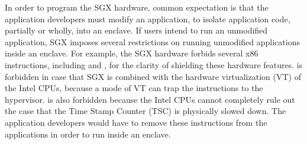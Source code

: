 In order to program the SGX hardware, common expectation is that the application developers must modify an application, to isolate application code, partially or wholly, into an enclave.
If users intend to run an unmodified application, SGX imposes several restrictions on running unmodified applications inside an enclave.
For example, the SGX hardware forbids several x86 instructions,
including  and , for the clarity of shielding these hardware features.
 is forbidden in case that SGX is combined with the hardware virtualization (VT) of the Intel CPUs, because a mode of VT can trap the  instructions to the hypervisor.
 is also forbidden because the Intel CPUs cannot completely rule out the case that the Time Stamp Counter (TSC) is physically slowed down. 
The application developers would have to remove these instructions from the applications in order to run inside an enclave.




